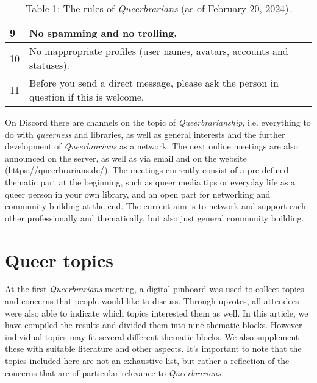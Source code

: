\documentclass[a4paper,
fontsize=11pt,
oneside,
numbers=noperiodatend,
parskip=half-,
bibliography=totoc,
final
]{scrartcl}
\begin{document}
\begin{table}[h]
\begin{tabular}{|ll|}
\multicolumn{1}{|l|}{9}  & No spamming and no trolling.                                                                                                                                               \\ \hline
\multicolumn{1}{|l|}{10} & No inappropriate profiles (user names, avatars, accounts and statuses).                                                                                                    \\ \hline
\multicolumn{1}{|l|}{11} & Before you send a direct message, please ask the person in question if this is welcome.                                                                                    \\ \hline
\end{tabular}
\caption{Table 1: The rules of \emph{Queerbrarians} (as of February 20, 2024).}
\end{table}

On Discord there are channels on the topic of \emph{Queerbrarianship},
i.e. everything to do with \emph{queerness} and libraries, as well as
general interests and the further development of \emph{Queerbrarians} as
a network. The next online meetings are also announced on the server, as
well as via email and on the website (\url{https://queerbrarians.de/}).
The meetings currently consist of a pre-defined thematic part at the
beginning, such as queer media tips or everyday life as a queer person
in your own library, and an open part for networking and community
building at the end. The current aim is to network and support each
other professionally and thematically, but also just general community
building.

\hypertarget{queer-topics}{%
\section{Queer topics}\label{queer-topics}}

At the first \emph{Queerbrarians} meeting, a digital pinboard was used
to collect topics and concerns that people would like to discuss.
Through upvotes, all attendees were also able to indicate which topics
interested them as well. In this article, we have compiled the results
and divided them into nine thematic blocks. However individual topics
may fit several different thematic blocks. We also supplement these with
suitable literature and other aspects. It's important to note that the
topics included here are not an exhaustive list, but rather a reflection
of the concerns that are of particular relevance to
\emph{Queerbrarians.}
\end{document}
